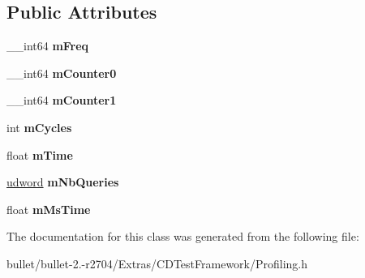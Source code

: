 \subsection*{Public Attributes}
\begin{DoxyCompactItemize}
\item 
\hypertarget{class_profiler_a09e68f4fd9d7bf8413a187a5be8e0a3e}{\+\_\+\+\_\+int64 {\bfseries m\+Freq}}\label{class_profiler_a09e68f4fd9d7bf8413a187a5be8e0a3e}

\item 
\hypertarget{class_profiler_a891a31fc1b1cca3c600d38edd4bcfebd}{\+\_\+\+\_\+int64 {\bfseries m\+Counter0}}\label{class_profiler_a891a31fc1b1cca3c600d38edd4bcfebd}

\item 
\hypertarget{class_profiler_ae7e1bbc13dbf4585f7aa7da37a669a44}{\+\_\+\+\_\+int64 {\bfseries m\+Counter1}}\label{class_profiler_ae7e1bbc13dbf4585f7aa7da37a669a44}

\item 
\hypertarget{class_profiler_ab985a8f38eafcd1241e42ec911043ea4}{int {\bfseries m\+Cycles}}\label{class_profiler_ab985a8f38eafcd1241e42ec911043ea4}

\item 
\hypertarget{class_profiler_a9d1d893e19e1d933448e79e30f9a0423}{float {\bfseries m\+Time}}\label{class_profiler_a9d1d893e19e1d933448e79e30f9a0423}

\item 
\hypertarget{class_profiler_ad3b9da7e88b33d2c1de7446b1b714d04}{\hyperlink{_ice_types_8h_a44c6f1920ba5551225fb534f9d1a1733}{udword} {\bfseries m\+Nb\+Queries}}\label{class_profiler_ad3b9da7e88b33d2c1de7446b1b714d04}

\item 
\hypertarget{class_profiler_af900af9fdc65e53ed57d148c2d7abcd3}{float {\bfseries m\+Ms\+Time}}\label{class_profiler_af900af9fdc65e53ed57d148c2d7abcd3}

\end{DoxyCompactItemize}


The documentation for this class was generated from the following file\+:\begin{DoxyCompactItemize}
\item 
bullet/bullet-\/2.-\/r2704/\+Extras/\+C\+D\+Test\+Framework/Profiling.\+h\end{DoxyCompactItemize}
